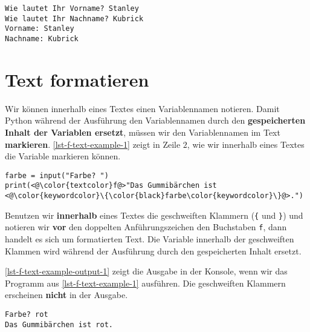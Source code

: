 \begin{lstlisting}[caption={Beispielausführung für das Programm aus \autoref{lst-input-example-2}.}, label=lst-input-example-output-2, language=output]
Wie lautet Ihr Vorname? Stanley
Wie lautet Ihr Nachname? Kubrick
Vorname: Stanley
Nachname: Kubrick
\end{lstlisting}

\section{Text formatieren}

Wir können innerhalb eines Textes einen Variablennamen notieren. Damit Python während der Ausführung den Variablennamen durch den \textbf{gespeicherten Inhalt der Variablen ersetzt}, müssen wir den Variablennamen im Text \textbf{markieren}. \autoref{lst-f-text-example-1} zeigt in Zeile $2$, wie wir innerhalb eines Textes die Variable markieren können.

\begin{lstlisting}[caption={Formatierter Text (\graybgtexttt{f-text\_bsp\_1.py}).}, label={lst-f-text-example-1}]
farbe = input("Farbe? ")
print(<@\color{textcolor}f@>"Das Gummibärchen ist <@\color{keywordcolor}\{\color{black}farbe\color{keywordcolor}\}@>.")
\end{lstlisting}

\begin{definition}
	Benutzen wir \textbf{innerhalb} eines Textes die geschweiften Klammern (\lstinline|{| und \lstinline|}|) und notieren wir \textbf{vor} den doppelten Anführungszeichen den Buchstaben \lstinline{f}, dann handelt es sich um formatierten Text. Die Variable innerhalb der geschweiften Klammen wird während der Ausführung durch den gespeicherten Inhalt ersetzt.
\end{definition}

\begin{example}
	\autoref{lst-f-text-example-output-1} zeigt die Ausgabe in der Konsole, wenn wir das Programm aus \autoref{lst-f-text-example-1} ausführen. Die geschweiften Klammern erscheinen \textbf{nicht} in der Ausgabe.
\end{example}

\begin{lstlisting}[caption={Der Variablennamen wird durch den gespeicherten Inhalt ersetzt.}, label=lst-f-text-example-output-1, language=output]
Farbe? rot
Das Gummibärchen ist rot.
\end{lstlisting}

